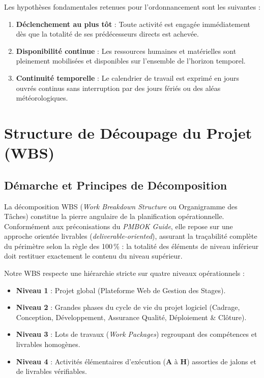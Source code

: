 \documentclass[a4paper,12pt]{report}
\begin{document}
	Les hypothèses fondamentales retenues pour l'ordonnancement sont les suivantes :
	\begin{enumerate}[leftmargin=1.2cm, noitemsep]
		\item \textbf{Déclenchement au plus tôt} : Toute activité est engagée immédiatement dès que la totalité de ses prédécesseurs directs est achevée.
		\item \textbf{Disponibilité continue} : Les ressources humaines et matérielles sont pleinement mobilisées et disponibles sur l'ensemble de l'horizon temporel.
		\item \textbf{Continuité temporelle} : Le calendrier de travail est exprimé en jours ouvrés continus sans interruption par des jours fériés ou des aléas météorologiques.
	\end{enumerate}

	\chapter{Structure de Découpage du Projet (WBS)}
	
	\section{Démarche et Principes de Décomposition}
	La décomposition WBS (\textit{Work Breakdown Structure} ou Organigramme des Tâches) constitue la pierre angulaire de la planification opérationnelle. Conformément aux préconisations du \textit{PMBOK Guide}, elle repose sur une approche orientée livrables (\textit{deliverable-oriented}), assurant la traçabilité complète du périmètre selon la règle des 100\,\% : la totalité des éléments de niveau inférieur doit restituer exactement le contenu du niveau supérieur.
	
	Notre WBS respecte une hiérarchie stricte sur quatre niveaux opérationnels :
	\begin{itemize}[leftmargin=1.2cm, noitemsep]
		\item \textbf{Niveau 1} : Projet global (Plateforme Web de Gestion des Stages).
		\item \textbf{Niveau 2} : Grandes phases du cycle de vie du projet logiciel (Cadrage, Conception, Développement, Assurance Qualité, Déploiement \& Clôture).
		\item \textbf{Niveau 3} : Lots de travaux (\textit{Work Packages}) regroupant des compétences et livrables homogènes.
		\item \textbf{Niveau 4} : Activités élémentaires d'exécution (\textbf{A} à \textbf{H}) assorties de jalons et de livrables vérifiables.
	\end{itemize}
	
\end{document}
